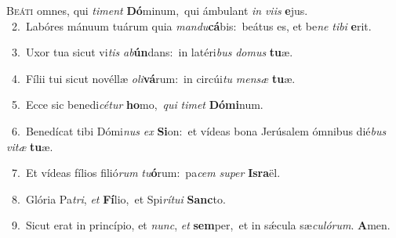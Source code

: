 \lettrine{\initial\textcolor{\initialcolor}{B}}{eáti} omnes, qui \textit{ti}\-\textit{ment} \textbf{Dó}\-minum,~\star qui ámbulant \textit{in} \textit{vi}\-\textit{is} \textbf{e}\-jus.\\
{\numbfont\textcolor{\numbcolor}{~2.}}~Labóres mánuum tuárum quia \textit{man}\-\textit{du}\textbf{cá}bis:~\star beátus es, et be\textit{ne} \textit{ti}\-\textit{bi} \textbf{e}\-rit.\par
{\numbfont\textcolor{\numbcolor}{~3.}}~Uxor tua sicut vi\textit{tis} \textit{ab}\-\textbf{ún}dans:~\star in latéri\textit{bus} \textit{do}\-\textit{mus} \textbf{tu}\-æ.\par
{\numbfont\textcolor{\numbcolor}{~4.}}~Fílii tui sicut novéllæ \textit{o}\-\textit{li}\textbf{vá}rum:~\star in circúi\textit{tu} \textit{men}\-\textit{sæ} \textbf{tu}\-æ.\par
{\numbfont\textcolor{\numbcolor}{~5.}}~Ecce sic benedi\-\textit{cé}\-\textit{tur} \textbf{ho}\-mo,~\star \textit{qui} \textit{ti}\-\textit{met} \textbf{Dó}\-\textbf{mi}num.\par
{\numbfont\textcolor{\numbcolor}{~6.}}~Benedícat tibi Dómi\textit{nus} \textit{ex} \textbf{Si}\-on:~\star et vídeas bona Jerúsalem ómnibus dié\textit{bus} \textit{vi}\-\textit{tæ} \textbf{tu}\-æ.\par
{\numbfont\textcolor{\numbcolor}{~7.}}~Et vídeas fílios filió\textit{rum} \textit{tu}\-\textbf{ó}rum:~\star pa\textit{cem} \textit{su}\-\textit{per} \textbf{Is}\-\textbf{ra}ël.\par
{\numbfont\textcolor{\numbcolor}{~8.}}~Glória Pa\-\textit{tri}\-, \textit{et} \textbf{Fí}\-lio,~\star et Spi\-\textit{rí}\-\textit{tu}\textit{i} \textbf{Sanc}\-to.\par
{\numbfont\textcolor{\numbcolor}{~9.}}~Sicut erat in princípio, et \textit{nunc}\-, \textit{et} \textbf{sem}\-per,~\star et in sǽcula sæ\-\textit{cu}\-\textit{ló}\textit{rum}. \textbf{A}\-men.\par
